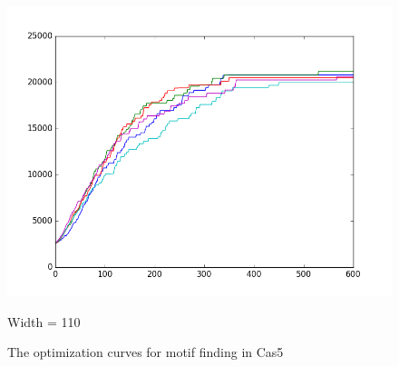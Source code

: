 \documentclass[11pt, oneside]{article}
\begin{document}
\begin{figure}[htbp]
\begin{minipage}{0.32\textwidth}
  \end{minipage}
  \hfill
  \begin{minipage}{0.32\textwidth}
    \centering
    \includegraphics[width=1\textwidth]{images/cas5_width110_curve} %
    \caption*{Width = 110}
  \end{minipage}
  \caption{The optimization curves for motif finding in Cas5}
  \label{fig:cas5}
\end{figure}
\end{document}
